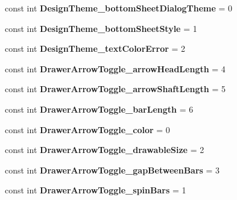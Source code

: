 \begin{DoxyCompactItemize}
const int {\bfseries Design\+Theme\+\_\+bottom\+Sheet\+Dialog\+Theme} = 0
\item 
\mbox{\label{classXaria_1_1Resource_1_1Styleable_aacb169af2306fbd9f86f6cccf5ebe05e}} 
const int {\bfseries Design\+Theme\+\_\+bottom\+Sheet\+Style} = 1
\item 
\mbox{\label{classXaria_1_1Resource_1_1Styleable_a1ce51de7a6c15bc4a883c5d66c3ac6fd}} 
const int {\bfseries Design\+Theme\+\_\+text\+Color\+Error} = 2
\item 
\mbox{\label{classXaria_1_1Resource_1_1Styleable_a030e303aa0fdea8a2b41a640844d0b76}} 
const int {\bfseries Drawer\+Arrow\+Toggle\+\_\+arrow\+Head\+Length} = 4
\item 
\mbox{\label{classXaria_1_1Resource_1_1Styleable_a28be20a5d5e9f9be262d207e89321037}} 
const int {\bfseries Drawer\+Arrow\+Toggle\+\_\+arrow\+Shaft\+Length} = 5
\item 
\mbox{\label{classXaria_1_1Resource_1_1Styleable_a2ed15d5ed57b707915d6239108032b7a}} 
const int {\bfseries Drawer\+Arrow\+Toggle\+\_\+bar\+Length} = 6
\item 
\mbox{\label{classXaria_1_1Resource_1_1Styleable_aeddf08506b10f38a2ab349b850cb1855}} 
const int {\bfseries Drawer\+Arrow\+Toggle\+\_\+color} = 0
\item 
\mbox{\label{classXaria_1_1Resource_1_1Styleable_a9d98475baebe1e4d357222e4264fda30}} 
const int {\bfseries Drawer\+Arrow\+Toggle\+\_\+drawable\+Size} = 2
\item 
\mbox{\label{classXaria_1_1Resource_1_1Styleable_a7aea3d265a76d143dce7acc7f47cfd75}} 
const int {\bfseries Drawer\+Arrow\+Toggle\+\_\+gap\+Between\+Bars} = 3
\item 
\mbox{\label{classXaria_1_1Resource_1_1Styleable_a3e0051a6c2a332ed43ef83504611b0cd}} 
const int {\bfseries Drawer\+Arrow\+Toggle\+\_\+spin\+Bars} = 1

\end{DoxyCompactItemize}
